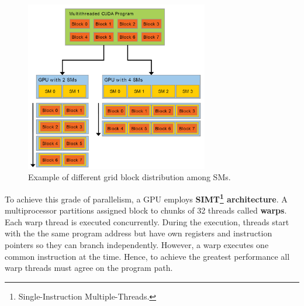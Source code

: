 \begin{figure}\centering
 	\includegraphics[width=8cm]{img/SM}
 	\caption{Example of different grid block distribution among SMs.}
 	\label{fig02:SM}
\end{figure}

To achieve this grade of parallelism, a GPU employs \textbf{SIMT\footnote{Single-Instruction Multiple-Threads.} architecture}. A multiprocessor partitions assigned block to chunks of 32 threads called \textbf{warps}. Each warp thread is executed concurrently. During the execution, threads start with the the same program address but have own registers and instruction pointers so they can branch independently. However, a warp executes one common instruction at the time. Hence, to achieve the greatest performance all warp threads must agree on the program path.
